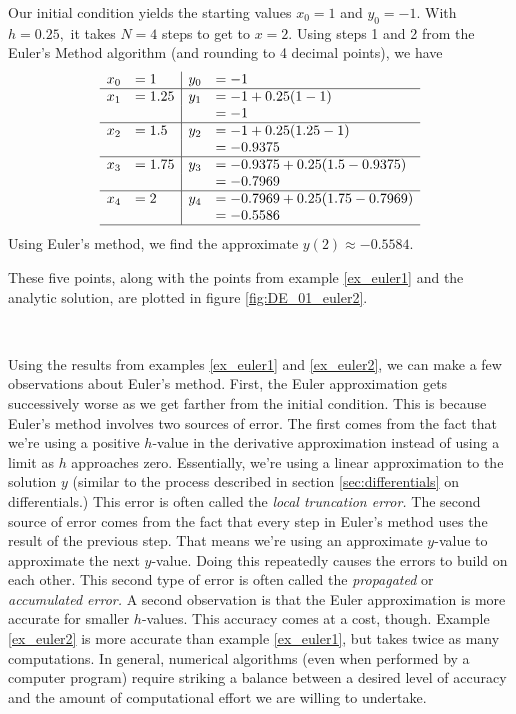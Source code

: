{Our initial condition yields the starting values $x_0 = 1$ and $y_0 = -1$.  With $h = 0.25,$ it takes $N=4$ steps to get to $x=2.$  Using steps 1 and 2 from the Euler's Method algorithm (and rounding to 4 decimal points), we have
\[
\begin{array}{rl | rl}
x_0  &= 1			& 	y_0	&= -1\\ \hline
x_1 	&= 1.25		&	y_1 	&= -1 + 0.25(1 - 1)\\
	&			&		&= -1\\ \hline
x_2 	&= 1.5 		& 	y_2 	&= -1 + 0.25(1.25-1)\\
	&			&		&= -0.9375\\ \hline
x_3	&= 1.75		&	y_3 	&= -0.9375 + 0.25(1.5-0.9375)\\
	&			&		&= -0.7969\\ \hline
x_4	&= 2			&	y_4	&= -0.7969 + 0.25(1.75 - 0.7969)\\
	&			&		&= -0.5586\\ \hline
\end{array}
\]
Using Euler's method, we find the approximate $y(2) \approx -0.5584.$

These five points, along with the points from example \ref{ex_euler1} and the analytic solution, are plotted in figure \ref{fig:DE_01_euler2}.
}\\


Using the results from examples \ref{ex_euler1} and \ref{ex_euler2}, we can make a few observations about Euler's method.  First, the Euler approximation gets successively worse as we get farther from the initial condition.  This is because Euler's method involves two sources of error.  The first comes from the fact that we're using a positive $h$-value in the derivative approximation instead of using a limit as $h$ approaches zero.  Essentially, we're using a linear approximation to the solution $y$ (similar to the process described in section \ref{sec:differentials} on differentials.) This error is often called the \emph{local truncation error.}  The second source of error comes from the fact that every step in Euler's method uses the result of the previous step.  That means we're using an approximate $y$-value to approximate the next $y$-value.  Doing this repeatedly causes the errors to build on each other.  This second type of error is often called the \emph{propagated} or \emph{accumulated error.} A second observation is that the Euler approximation is more accurate for smaller $h$-values.  This accuracy comes at a cost, though.  Example \ref{ex_euler2} is more accurate than example \ref{ex_euler1}, but takes twice as many computations.  In general, numerical algorithms (even when performed by a computer program) require striking a balance between a desired level of accuracy and the amount of computational effort we are willing to undertake.

